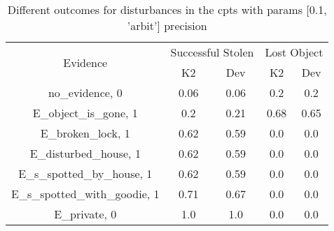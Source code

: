 \begin{table}\begin{tabular}{c|cc|cc}\toprule\multirow{2}{*}{Evidence} & \multicolumn{2}{c}{Successful Stolen} & \multicolumn{2}{c}{Lost Object} \\& {K2} & {Dev} & {K2} & {Dev} \\\midrule
no\_evidence, 0 & 0.06&0.06&0.2&0.2\\E\_object\_is\_gone, 1 & \cellcolor{Bittersweet}0.2&\cellcolor{Bittersweet}0.21&\cellcolor{Bittersweet}0.68&\cellcolor{Bittersweet}0.65\\E\_broken\_lock, 1 & \cellcolor{Bittersweet}0.62&\cellcolor{Bittersweet}0.59&0.0&0.0\\E\_disturbed\_house, 1 & \cellcolor{Bittersweet}0.62&\cellcolor{Bittersweet}0.59&0.0&0.0\\E\_s\_spotted\_by\_house, 1 & \cellcolor{Bittersweet}0.62&\cellcolor{Bittersweet}0.59&0.0&0.0\\E\_s\_spotted\_with\_goodie, 1 & \cellcolor{Bittersweet}0.71&\cellcolor{Bittersweet}0.67&0.0&0.0\\E\_private, 0 & 1.0&1.0&0.0&0.0\\\bottomrule\end{tabular}\caption{Different outcomes for disturbances in the cpts with params [0.1, 'arbit'] precision}\end{table}